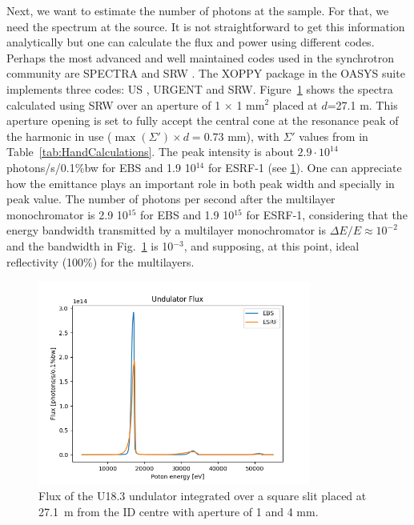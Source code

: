 \documentclass{iucr}              %
\begin{document}
Next, we want to estimate the number of photons at the sample. For that, we need the spectrum at the source. It is not straightforward to get this information analytically but one can calculate the flux and power using different codes. Perhaps the most advanced and well maintained codes used in the synchrotron community are SPECTRA \cite{codeSPECTRA} and SRW \cite{codeSRW}. The XOPPY package in the OASYS suite implements three codes: US \cite{codeUS}, URGENT \cite{codeURGENT} and SRW. Figure~\ref{fig:FluxU18} shows the spectra calculated using SRW over an aperture of 1 $\times$ 1 mm$^2$ placed at $d$=27.1 m. This aperture opening is set to fully accept the central cone at the resonance peak of the harmonic in use ($\max(\Sigma') \times d = 0.73$ mm), with $\Sigma'$ values from in Table~\ref{tab:HandCalculations}. The peak intensity is about  $2.9\cdot10^{14}$ photons/s/0.1{\%}bw for EBS and 1.9 10$^{14}$ for ESRF-1 (see \ref{fig:FluxU18}). One can appreciate how the emittance plays an important role in both peak width and specially in peak value. The number of photons per second after the multilayer monochromator is 2.9 10$^{15}$ for EBS and 1.9 10$^{15}$ for ESRF-1, considering that the energy bandwidth transmitted by a multilayer monochromator is $\Delta E/E \approx 10^{-2}$ and the bandwidth in Fig.~\ref{fig:FluxU18} is 10$^{-3}$, and supposing, at this point, ideal reflectivity (100\%) for the multilayers. 

\begin{figure}\label{fig:FluxU18}
    \centering
    \includegraphics[width=0.8\textwidth]{GRAPHICS/fluxU18.png}
    \caption{Flux of the U18.3 undulator integrated over a square slit placed at 27.1~m from the ID centre with aperture of 1 and 4 mm.}
\end{figure}
\end{document}
